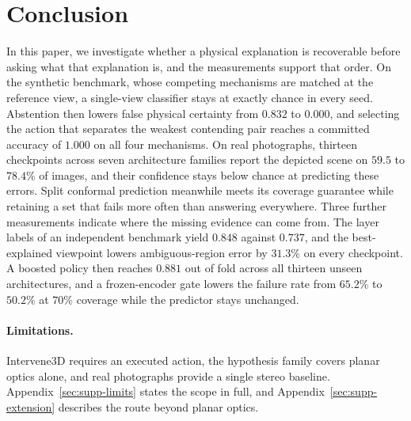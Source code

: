 \documentclass{article} %
\theoremstyle{defstyle}
\theoremstyle{plain}
\renewcommand{\textfraction}{0.12}
\renewcommand{\floatpagefraction}{0.75}
\begin{document}
\section{Conclusion}
\label{sec:conclusion}

In this paper, we investigate whether a physical explanation is recoverable before asking what that
explanation is, and the measurements support that order. On the synthetic benchmark, whose
competing mechanisms are matched at the reference view, a single-view classifier stays at
exactly chance in every seed. Abstention then lowers false physical certainty from $0.832$ to
$0.000$, and selecting the action that separates the weakest contending pair reaches a
committed accuracy of $1.000$ on all four mechanisms. On real photographs, thirteen checkpoints
across seven architecture families report the depicted scene on $59.5$ to $78.4\%$ of images,
and their confidence stays below chance at predicting these errors. Split conformal prediction
meanwhile meets its coverage guarantee while retaining a set that fails more often than
answering everywhere. Three further measurements indicate where the missing evidence can come
from. The layer labels of an independent benchmark yield $0.848$ against $0.737$, and the
best-explained viewpoint lowers ambiguous-region error by $31.3\%$ on every checkpoint. A boosted
policy then reaches $0.881$ out of fold across all thirteen unseen architectures, and a
frozen-encoder gate lowers the failure rate from $65.2\%$ to $50.2\%$ at $70\%$ coverage while
the predictor stays unchanged.

\paragraph{Limitations.} Intervene3D requires an executed action, the hypothesis family covers planar optics alone, and real photographs provide a single stereo baseline.
Appendix~\ref{sec:supp-limits} states the scope in full, and Appendix~\ref{sec:supp-extension}
describes the route beyond planar optics.





\clearpage
\clearpage
\appendix
\setcounter{topnumber}{2}
\setcounter{bottomnumber}{1}
\setcounter{totalnumber}{2}
\renewcommand{\floatpagefraction}{0.92}
\renewcommand{\textfraction}{0.08}
\end{document}
